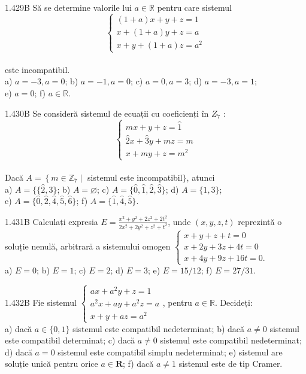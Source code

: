 \documentclass[11pt]{article}
\begin{document}
1.429B Să se determine valorile lui $a \in \mathbb{R}$ pentru care sistemul $$\left\{\begin{array}{l}(1+a) x+y+z=1 \\x+(1+a) y+z=a \\x+y+(1+a) z=a^{2}\end{array}\right.$$\\este incompatibil.\\ a) $a=-3, a=0$; b) $a=-1, a=0$; c) $a=0, a=3$; d) $a=-3, a=1$;\\ e) $a=0$; f) $a \in \mathbb{R}$.

1.430B Se consideră sistemul de ecuații cu coeficienți în $Z_{7}$ : $$\left\{\begin{array}{l}m x+y+z=\hat{1} \\\hat{2} x+\hat{3} y+m z=m \\x+m y+z=m^{2}\end{array}\right.$$\\Dacă $A=\left\{m \in \mathbb{Z}_{7} \mid\right.$ sistemul este incompatibil$\}$, atunci\\ a) $A=\{\{\hat{2}, \hat{3}\}$; b) $A=\varnothing$; c) $A=\{\hat{0}, \hat{1}, \hat{2}, \hat{3}\}$; d) $A=\{1,3\}$;\\ e) $A=\{\hat{0}, \hat{2}, \hat{4}, \hat{5}, \hat{6}\}$; f) $A=\{\hat{1}, \hat{4}, \hat{5}\}$.

1.431B Calculați expresia $E=\frac{x^{2}+y^{2}+2 z^{2}+2 t^{2}}{2 x^{2}+2 y^{2}+z^{2}+t^{2}}$, unde $(x, y, z, t)$ reprezintă o soluție nenulă, arbitrară a sistemului omogen $\left\{\begin{array}{l}x+y+z+t=0 \\ x+2 y+3 z+4 t=0 \\ x+4 y+9 z+16 t=0 .\end{array}\right.$\\ a) $E=0$; b) $E=1$; c) $E=2$; d) $E=3$; e) $E=15 / 12$; f) $E=27 / 31$.

1.432B Fie sistemul $\left\{\begin{array}{l}a x+a^{2} y+z=1 \\ a^{2} x+a y+a^{2} z=a \\ x+y+a z=a^{2}\end{array}\right.$, pentru $a \in \mathbb{R}$. Decideți:\\ a) dacă $a \in\{0,1\}$ sistemul este compatibil nedeterminat; b) dacă $a \neq 0$ sistemul este compatibil determinat; c) dacă $a \neq 0$ sistemul este compatibil nedeterminat; d) dacă $a=0$ sistemul este compatibil simplu nedeterminat; e) sistemul are soluție unică pentru orice $a \in \mathbf{R}$; f) dacă $a \neq 1$ sistemul este de tip Cramer.
\end{document}
